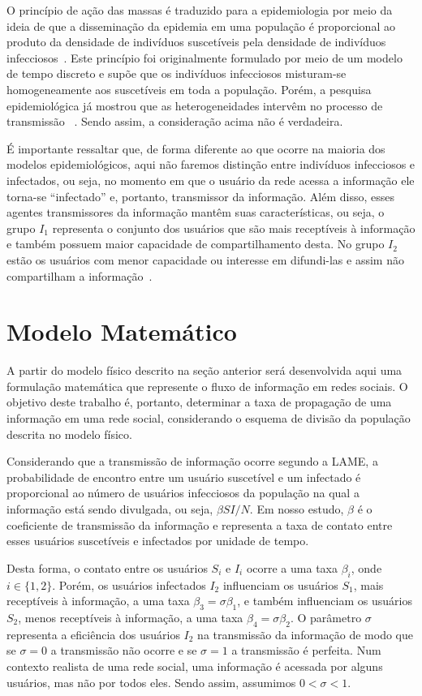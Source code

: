 \documentclass[
	12pt,				%
	openright,			%
	oneside,			%
	a4paper,			%
	english,			%
	french,				%
	spanish,			%
	brazil				%
	]{abntex2}
\begin{document}
O princípio de ação das massas é traduzido para a epidemiologia por
meio da ideia de que a disseminação da epidemia em uma população é
proporcional ao produto da densidade de indivíduos suscetíveis pela
densidade de indivíduos infecciosos~\cite{massad1996}. Este princípio
foi originalmente formulado por meio de um modelo de tempo discreto e
supõe que os indivíduos infecciosos misturam-se homogeneamente aos
suscetíveis em toda a população. Porém, a pesquisa epidemiológica já
mostrou que as heterogeneidades intervêm no processo de transmissão
~\cite{coutinho2004}. Sendo assim, a consideração acima não é
verdadeira.

É importante ressaltar que, de forma diferente ao que ocorre na
maioria dos modelos epidemiológicos, aqui não faremos distinção entre
indivíduos infecciosos e infectados, ou seja, no momento em que o
usuário da rede acessa a informação ele torna-se ``infectado'' e,
portanto, transmissor da informação. Além disso, esses agentes
transmissores da informação mantêm suas características, ou seja, o
grupo $I_1$ representa o conjunto dos usuários que são mais
receptíveis à informação e também possuem maior capacidade de
compartilhamento desta. No grupo $I_2$ estão os usuários com menor
capacidade ou interesse em difundi-las e assim não compartilham a
informação~\cite{pachi2006}.


\chapter{Modelo Matemático}
A partir do modelo físico descrito na seção anterior será desenvolvida
aqui uma formulação matemática que represente o fluxo de informação em
redes sociais. O objetivo deste trabalho é, portanto, determinar a
taxa de propagação de uma informação em uma rede social, considerando
o esquema de divisão da população descrita no modelo físico.

Considerando que a transmissão de informação ocorre segundo a LAME, a
probabilidade de encontro entre um usuário suscetível e um infectado é
proporcional ao número de usuários infecciosos da população na qual a
informação está sendo divulgada, ou seja, $\beta SI / N$. Em nosso
estudo, $\beta$ é o coeficiente de transmissão da informação e
representa a taxa de contato entre esses usuários suscetíveis e
infectados por unidade de tempo.

Desta forma, o contato entre os usuários $S_i$ e $I_i$ ocorre a uma
taxa $\beta_i$, onde $i \in \{1,2\}$. Porém, os usuários infectados
$I_2$ influenciam os usuários $S_1$, mais receptíveis à informação, a
uma taxa $\beta_3 = \sigma \beta_1$, e também influenciam os usuários
$S_2$, menos receptíveis à informação, a uma taxa $\beta_4 = \sigma
\beta_2$. O parâmetro $\sigma$ representa a eficiência dos usuários
$I_2$ na transmissão da informação de modo que se $\sigma = 0$ a
transmissão não ocorre e se $\sigma = 1$ a transmissão é perfeita. Num
contexto realista de uma rede social, uma informação é acessada por
alguns usuários, mas não por todos eles. Sendo assim, assumimos $0 <
\sigma < 1$.
\end{document}
